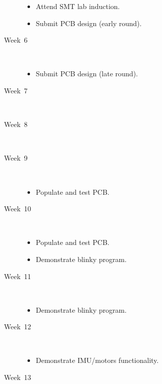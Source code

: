 \documentclass[11pt, a4paper]{article}
\begin{document}
\begin{description}
  \begin{itemize}
  \item Attend SMT lab induction.
  \item Submit PCB design (early round).
  \end{itemize}

\item [Week~6]\mbox{}\\

  \begin{itemize}
  \item Submit PCB design (late round).
  \end{itemize}

\item [Week~7]\mbox{}\\


\item [Week~8]\mbox{}\\


\item [Week~9]\mbox{}\\

  \begin{itemize}
  \item Populate and test PCB.
  \end{itemize}


\item [Week~10]\mbox{}\\

  \begin{itemize}
  \item Populate and test PCB.
  \item Demonstrate blinky program.
  \end{itemize}

\item [Week~11]\mbox{}\\

  \begin{itemize}
  \item Demonstrate blinky program.
  \end{itemize}

\item [Week~12]\mbox{}\\

  \begin{itemize}
  \item Demonstrate IMU/motors functionality.
  \end{itemize}

\item [Week~13]\mbox{}\\


\end{description}
\end{document}
